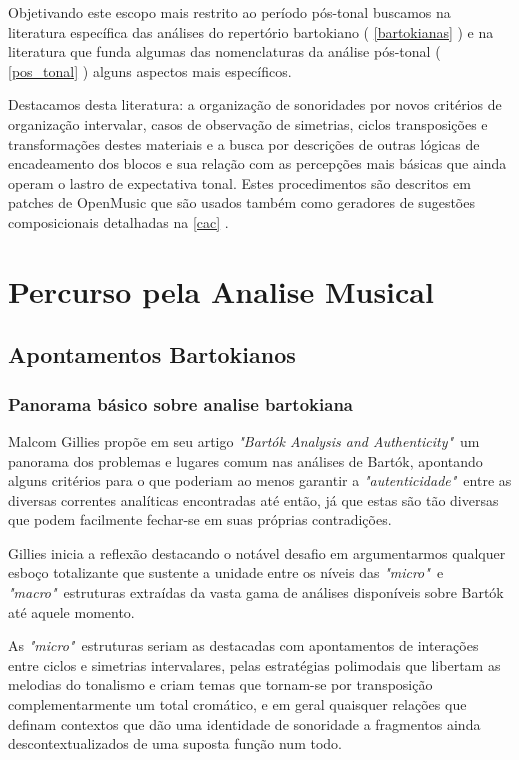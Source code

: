 \documentclass[
	12pt,				%
	openright,			%
	twoside,			%
	a4paper,			%
	english,			%
	french,				%
	spanish,			%
	brazil				%
	]{abntex2}
\begin{document}
Objetivando este escopo mais restrito ao período pós-tonal buscamos na literatura específica das análises do repertório bartokiano ( \autoref{bartokianas} ) e na literatura que funda algumas das nomenclaturas da análise pós-tonal ( \autoref{pos_tonal} ) alguns aspectos mais específicos. 

Destacamos desta literatura: a organização de sonoridades por novos critérios de organização intervalar, casos de observação de simetrias, ciclos transposições e transformações destes materiais e a busca por descrições de outras lógicas de encadeamento dos blocos e sua relação com as percepções mais básicas que ainda operam o lastro de expectativa tonal. Estes procedimentos são descritos em patches de OpenMusic que são usados também como geradores de sugestões composicionais detalhadas na \autoref{cac} .


\part{Percurso pela Analise Musical }


\chapter{Apontamentos Bartokianos}
\label{bartokianas}

\section{Panorama básico sobre analise bartokiana}

Malcom Gillies propõe em seu artigo \textit{"Bartók Analysis and Authenticity"}\cite{gillies1995bartok}\ um panorama dos problemas e lugares comum nas análises de Bartók, apontando alguns critérios para o que poderiam ao menos garantir a \textit{"autenticidade"}\ entre as diversas correntes analíticas encontradas até então, já que estas são tão diversas que podem facilmente fechar-se em suas próprias contradições. 

Gillies inicia a reflexão destacando o notável desafio em argumentarmos qualquer esboço totalizante que sustente a unidade entre os níveis das \textit{ "micro"}\ e \textit{"macro"}\ estruturas extraídas da vasta gama de análises disponíveis sobre Bartók até aquele momento.

As \textit{ "micro"}\ estruturas seriam as destacadas com apontamentos de interações entre ciclos e simetrias intervalares, pelas estratégias polimodais que libertam as melodias do tonalismo e criam temas que tornam-se por transposição complementarmente um total cromático, e em geral quaisquer relações que definam contextos que dão uma identidade de sonoridade a fragmentos ainda descontextualizados de uma suposta função num todo. 
\end{document}
